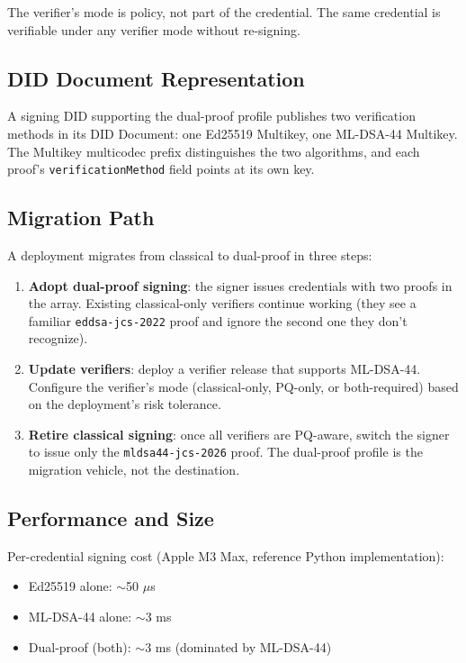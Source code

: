 \documentclass[11pt,a4paper,twocolumn]{article}
\begin{document}
The verifier's mode is policy, not part of the credential. The same credential is verifiable under any verifier mode without re-signing.

\subsection{DID Document Representation}

A signing DID supporting the dual-proof profile publishes two verification methods in its DID Document: one Ed25519 Multikey, one ML-DSA-44 Multikey. The Multikey multicodec prefix distinguishes the two algorithms, and each proof's \verb|verificationMethod| field points at its own key.

\subsection{Migration Path}

A deployment migrates from classical to dual-proof in three steps:

\begin{enumerate}[label=\arabic*.,leftmargin=*]
\item \textbf{Adopt dual-proof signing}: the signer issues credentials with two proofs in the array. Existing classical-only verifiers continue working (they see a familiar \texttt{eddsa-jcs-2022} proof and ignore the second one they don't recognize).
\item \textbf{Update verifiers}: deploy a verifier release that supports ML-DSA-44. Configure the verifier's mode (classical-only, PQ-only, or both-required) based on the deployment's risk tolerance.
\item \textbf{Retire classical signing}: once all verifiers are PQ-aware, switch the signer to issue only the \texttt{mldsa44-jcs-2026} proof. The dual-proof profile is the migration vehicle, not the destination.
\end{enumerate}

\subsection{Performance and Size}

Per-credential signing cost (Apple M3 Max, reference Python implementation):

\begin{itemize}[leftmargin=*]
\item Ed25519 alone: $\sim$50 $\mu$s
\item ML-DSA-44 alone: $\sim$3 ms
\item Dual-proof (both): $\sim$3 ms (dominated by ML-DSA-44)
\end{itemize}
\end{document}
